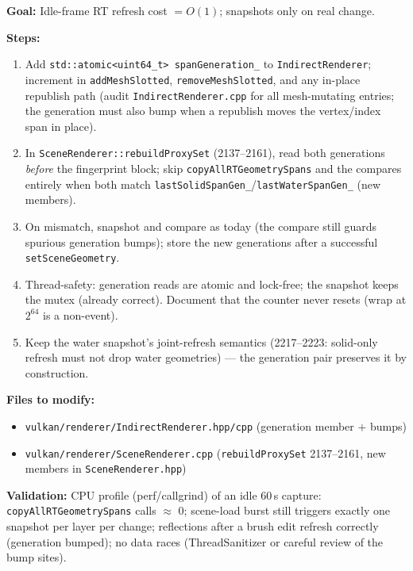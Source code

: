 \documentclass[11pt,a4paper]{article}
\begin{document}
\begin{tcolorbox}[promptbox={Prompt: Replace Per-Frame Span Snapshots with Generation Counters}]
\textbf{Goal:} Idle-frame RT refresh cost $= O(1)$; snapshots only on real change.

\textbf{Steps:}
\begin{enumerate}
    \item Add \texttt{std::atomic<uint64\_t> spanGeneration\_} to \texttt{IndirectRenderer}; increment in \texttt{addMeshSlotted}, \texttt{removeMeshSlotted}, and any in-place republish path (audit \texttt{IndirectRenderer.cpp} for all mesh-mutating entries; the generation must also bump when a republish moves the vertex/index span in place).
    \item In \texttt{SceneRenderer::rebuildProxySet} (2137--2161), read both generations \emph{before} the fingerprint block; skip \texttt{copyAllRTGeometrySpans} and the compares entirely when both match \texttt{lastSolidSpanGen\_}/\texttt{lastWaterSpanGen\_} (new members).
    \item On mismatch, snapshot and compare as today (the compare still guards spurious generation bumps); store the new generations after a successful \texttt{setSceneGeometry}.
    \item Thread-safety: generation reads are atomic and lock-free; the snapshot keeps the mutex (already correct). Document that the counter never resets (wrap at $2^{64}$ is a non-event).
    \item Keep the water snapshot's joint-refresh semantics (2217--2223: solid-only refresh must not drop water geometries) --- the generation pair preserves it by construction.
\end{enumerate}

\textbf{Files to modify:}
\begin{itemize}
    \item \texttt{vulkan/renderer/IndirectRenderer.hpp/cpp} (generation member $+$ bumps)
    \item \texttt{vulkan/renderer/SceneRenderer.cpp} (\texttt{rebuildProxySet} 2137--2161, new members in \texttt{SceneRenderer.hpp})
\end{itemize}

\textbf{Validation:} CPU profile (perf/callgrind) of an idle 60\,s capture: \texttt{copyAllRTGeometrySpans} calls $\approx$ 0; scene-load burst still triggers exactly one snapshot per layer per change; reflections after a brush edit refresh correctly (generation bumped); no data races (ThreadSanitizer or careful review of the bump sites).
\end{tcolorbox}
\end{document}
